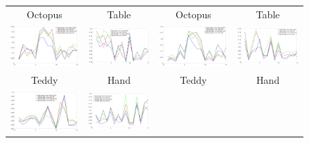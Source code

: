 \documentclass[acmtog,authorversion]{acmart}
\begin{document}
\begin{figure}
\begin{tabular}{cc||cc}
\hline
Octopus &Table &Octopus &Table\\
\includegraphics[width=120pt]{FMAP-images/7-STATISTICS-40.jpg} 		%
&\includegraphics[width=120pt]{FMAP-images/8-STATISTICS-40.jpg} 	%
&\includegraphics[width=120pt]{FMAP-images/7-STATISTICS-50.jpg}		%
&\includegraphics[width=120pt]{FMAP-images/8-STATISTICS-50.jpg}\\	%
\hline
Teddy &Hand &Teddy &Hand\\
\includegraphics[width=120pt]{FMAP-images/9-STATISTICS-40.jpg}		%
&\includegraphics[width=120pt]{FMAP-images/10-STATISTICS-40.jpg}	%

\end{tabular}
\end{figure}
\end{document}
